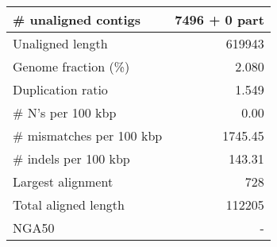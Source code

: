 \documentclass[12pt,a4paper]{article}
\begin{document}
\begin{table}[ht]
\begin{center}
\begin{tabular}{|l*{1}{|r}|}
\# unaligned contigs & 7496 + 0 part \\ \hline
Unaligned length & 619943 \\ \hline
Genome fraction (\%) & 2.080 \\ \hline
Duplication ratio & 1.549 \\ \hline
\# N's per 100 kbp & 0.00 \\ \hline
\# mismatches per 100 kbp & 1745.45 \\ \hline
\# indels per 100 kbp & 143.31 \\ \hline
Largest alignment & 728 \\ \hline
Total aligned length & 112205 \\ \hline
NGA50 & - \\ \hline
\end{tabular}
\end{center}
\end{table}
\end{document}
